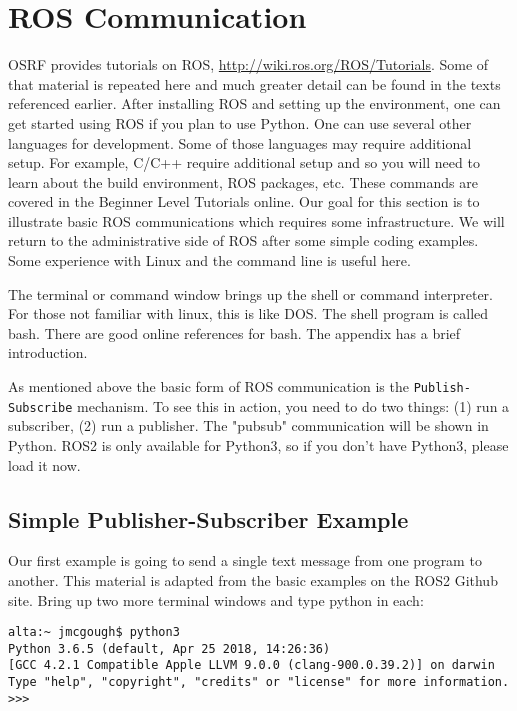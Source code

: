 \hypertarget{ros-communication}{%
\section{ROS Communication}\label{ros-communication}}

OSRF provides tutorials on ROS, \url{http://wiki.ros.org/ROS/Tutorials}.
Some of that material is repeated here and much greater detail can be
found in the texts referenced earlier. After installing ROS and setting
up the environment, one can get started using ROS if you plan to use
Python. One can use several other languages for development. Some of
those languages may require additional setup. For example, C/C++ require
additional setup and so you will need to learn about the build
environment, ROS packages, etc. These commands are covered in the
Beginner Level Tutorials online. Our goal for this section is to
illustrate basic ROS communications which requires some infrastructure.
We will return to the administrative side of ROS after some simple
coding examples. Some experience with Linux and the command line is
useful here.

The terminal or command window brings up the shell or command
interpreter. For those not familiar with linux, this is like DOS. The
shell program is called bash. There are good online references for bash.
The appendix has a brief introduction.

As mentioned above the basic form of ROS communication is the
\texttt{Publish-Subscribe} mechanism. To see this in action, you need to
do two things: (1) run a subscriber, (2) run a publisher. The "pubsub"
communication will be shown in Python. ROS2 is only available for
Python3, so if you don't have Python3, please load it now.

\hypertarget{simple-publisher-subscriber-example}{%
\subsection{Simple Publisher-Subscriber
Example}\label{simple-publisher-subscriber-example}}

Our first example is going to send a single text message from one
program to another. This material is adapted from the basic examples on
the ROS2 Github site. Bring up two more terminal windows and type python
in each:

\begin{verbatim}
alta:~ jmcgough$ python3
Python 3.6.5 (default, Apr 25 2018, 14:26:36)
[GCC 4.2.1 Compatible Apple LLVM 9.0.0 (clang-900.0.39.2)] on darwin
Type "help", "copyright", "credits" or "license" for more information.
>>>
\end{verbatim}

